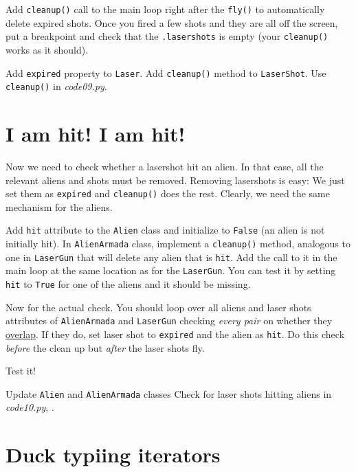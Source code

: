 \documentclass[
]{book}
\begin{document}
Add \texttt{cleanup()} call to the main loop right after the \texttt{fly()} to automatically delete expired shots. Once you fired a few shots and they are all off the screen, put a breakpoint and check that the \texttt{.lasershots} is empty (your \texttt{cleanup()} works as it should).

Add \texttt{expired} property to \texttt{Laser}.
Add \texttt{cleanup()} method to \texttt{LaserShot}.
Use \texttt{cleanup()} in \emph{code09.py}.

\hypertarget{i-am-hit-i-am-hit}{%
\section{I am hit! I am hit!}\label{i-am-hit-i-am-hit}}

Now we need to check whether a lasershot hit an alien. In that case, all the relevant aliens and shots must be removed. Removing lasershots is easy: We just set them as \texttt{expired} and \texttt{cleanup()} does the rest. Clearly, we need the same mechanism for the aliens.

Add \texttt{hit} attribute to the \texttt{Alien} class and initialize to \texttt{False} (an alien is not initially hit). In \texttt{AlienArmada} class, implement a \texttt{cleanup()} method, analogous to one in \texttt{LaserGun} that will delete any alien that is \texttt{hit}. Add the call to it in the main loop at the same location as for the \texttt{LaserGun}. You can test it by setting \texttt{hit} to \texttt{True} for one of the aliens and it should be missing.

Now for the actual check. You should loop over all aliens and laser shots attributes of \texttt{AlienArmada} and \texttt{LaserGun} checking \emph{every pair} on whether they \href{https://psychopy.org/api/visual/imagestim.html\#psychopy.visual.ImageStim.overlaps}{overlap}. If they do, set laser shot to \texttt{expired} and the alien as \texttt{hit}. Do this check \emph{before} the clean up but \emph{after} the laser shots fly.

Test it!

Update \texttt{Alien} and \texttt{AlienArmada} classes
Check for laser shots hitting aliens
in \emph{code10.py}, .

\hypertarget{duck-typiing-iterators}{%
\section{Duck typiing iterators}\label{duck-typiing-iterators}}
\end{document}
